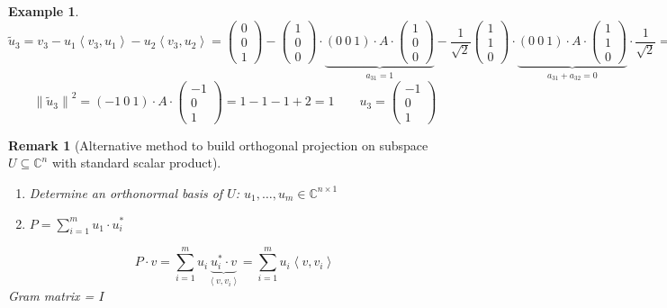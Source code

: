 \documentclass{article}
\newtheorem{example}{Example}  \numberwithin{example}{section}
\newtheorem{remark}{Remark}  \numberwithin{remark}{section}
\newcommand{\ip}[2]{\left\langle#1,#2\right\rangle} %
\newcommand{\norm}[1]{\left\|#1\right\|}
\newcommand{\vecthree}[3]{\begin{pmatrix} #1 \\ #2 \\ #3 \end{pmatrix}}
\begin{document}
\begin{example}
  \[ \tilde u_3 = v_3 - u_1 \ip{v_3}{u_1} - u_2 \ip{v_3}{u_2} = \begin{pmatrix} 0 \\ 0 \\ 1 \end{pmatrix} - \vecthree100 \cdot \underbrace{(0 \: 0 \: 1) \cdot A \cdot \vecthree100}_{a_{31} = 1} - \frac{1}{\sqrt{2}} \vecthree110 \cdot \underbrace{(0 \: 0 \: 1) \cdot A \cdot \vecthree110}_{a_{31} + a_{32} = 0} \cdot \frac{1}{\sqrt2} = \vecthree{-1}01 \]
  \[ \norm{\tilde u_3}^2 = (-1 \: 0 \: 1) \cdot A \cdot \vecthree{-1}{0}1 = 1 - 1 - 1 + 2 = 1 \qquad u_3 = \vecthree{-1}{0}{1} \]
\end{example}

\begin{remark}[Alternative method to build orthogonal projection on subspace $U \subseteq \mathbb C^n$ with standard scalar product] %
  \begin{enumerate}
    \item Determine an orthonormal basis of $U$: $u_1, \ldots, u_m \in \mathbb C^{n\times 1}$
    \item $P = \sum_{i=1}^m u_1 \cdot u_i^*$
  \end{enumerate}
  \[ P \cdot v = \sum_{i=1}^m u_i \underbrace{u_i^* \cdot v}_{\ip{v}{v_i}} = \sum_{i=1}^m u_i \ip{v}{v_i} \]
  Gram matrix = $I$
\end{remark}
\end{document}
